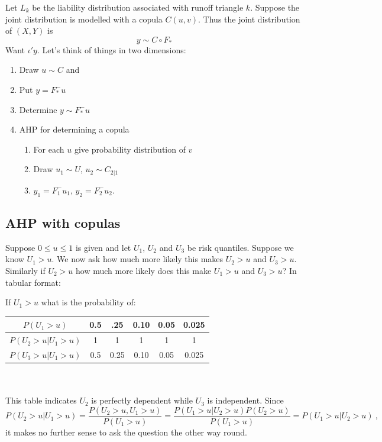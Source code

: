 \documentclass[a4paper,12pt]{article}
\begin{document}
Let $L_k$ be the liability distribution associated with runoff triangle $k$.   Suppose the joint distribution is modelled with a copula $C(u,v)$.  Thus the joint distribution of $(X,Y)$ is
$$
y\sim C\circ F_*
$$
Want $\iota'y$.  Let's think of things in two dimensions:
\begin{enumerate}
    \item Draw $u\sim C$ and
    \item Put $y=F_*^-u$
    \item Determine $y\sim F_*^-u$
    \item AHP for determining a copula
    \begin{enumerate}
        \item For each $u$ give probability distribution of $v$
        \item Draw $u_1\sim U$, $u_2\sim C_{2|1}$
        \item $y_1=F_1^-u_1$, $y_2=F_2^-u_2$.
    \end{enumerate}
\end{enumerate}


\subsection*{AHP with copulas}

Suppose $0\le u \le 1$ is given and let $U_1$, $U_2$ and $U_3$ be risk quantiles.  Suppose we know $U_1>u$.   We now ask how much more likely this makes $U_2>u$ and $U_3>u$.  Similarly if $U_2>u$ how much more likely does this make $U_1>u$ and $U_3>u$? In tabular format:

If $U_1>u$ what is the probability of:


\begin{tabular}{|c|c|c|c|c|c|}
  \hline
  $P(U_1>u)$ & 0.5 & .25 & 0.10 & 0.05 & 0.025 \\
  \hline
  $P(U_2>u|U_1>u)$ & 1 & 1 & 1 & 1 & 1\\
  $P(U_3>u|U_1>u)$ & 0.5 & 0.25 & 0.10 & 0.05 & 0.025\\
  \hline
\end{tabular}
\\\\
This table indicates $U_2$ is perfectly dependent while $U_3$ is independent.
Since
$$
P(U_2> u|U_1> u) =\frac{P(U_2>u, U_1>u)}{P(U_1>u)} = \frac{P(U_1>u|U_2>u)P(U_2>u)}{P(U_1>u)}=P(U_1>u|U_2>u)\ ,
$$
it makes no further sense to ask the question the other way round.
\end{document}
